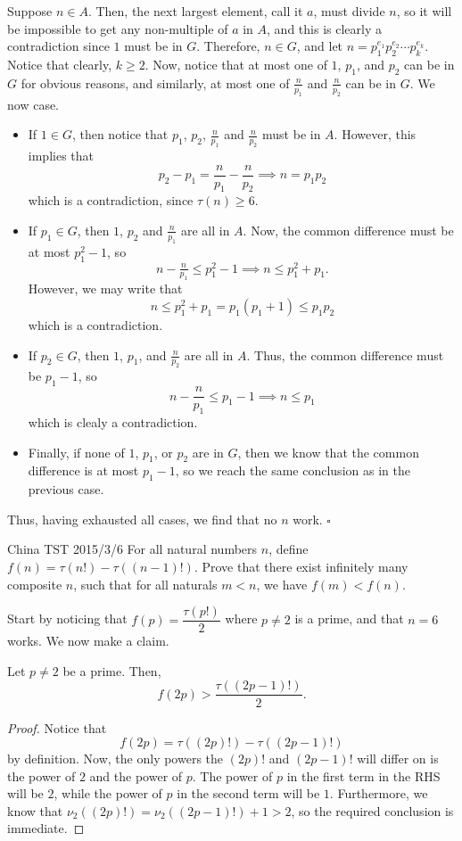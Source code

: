 \documentclass{article}
\begin{document}
Suppose $n \in A$. Then, the next largest element, call it $a$, must divide $n$, so it will be impossible to get any non-multiple of $a$ in $A$, and this is clearly a contradiction since $1$ must be in $G$. Therefore, $n \in G$, and let $n = p_1^{e_1}p_2^{e_2}\cdots p_k^{e_k}$. Notice that clearly, $k \ge 2$. Now, notice that at most one of $1$, $p_1$, and $p_2$ can be in $G$ for obvious reasons, and similarly, at most one of $\tfrac{n}{p_1}$ and $\tfrac{n}{p_2}$ can be in $G$. We now case.

\begin{itemize}
\item If $1 \in G$, then notice that $p_1$, $p_2$, $\tfrac{n}{p_1}$ and $\tfrac{n}{p_2}$ must be in $A$. However, this implies that \[p_2-p_1 = \dfrac{n}{p_1}-\dfrac{n}{p_2} \implies n = p_1p_2\] which is a contradiction, since $\tau(n) \ge 6$.
\item If $p_1 \in G$, then $1$, $p_2$ and $\tfrac{n}{p_1}$ are all in $A$. Now, the common difference must be at most $p_1^2-1$, so \[n-\tfrac{n}{p_1} \le p_1^2-1 \implies n \le p_1^2+p_1.\] However, we may write that \[n \le p_1^2+p_1 = p_1(p_1+1) \le p_1p_2\] which is a contradiction.
\item If $p_2 \in G$, then $1$, $p_1$, and $\tfrac{n}{p_2}$ are all in $A$. Thus, the common difference must be $p_1-1$, so \[n-\dfrac{n}{p_1} \le p_1-1 \implies n \le p_1\] which is clealy a contradiction.
\item Finally, if none of $1$, $p_1$, or $p_2$ are in $G$, then we know that the common difference is at most $p_1-1$, so we reach the same conclusion as in the previous case.
\end{itemize}

Thus, having exhausted all cases, we find that no $n$ work. $\square$

\begin{problem}[3.7.21]{China TST 2015/3/6}
For all natural numbers $n$, define $f(n) = \tau(n!) - \tau((n - 1)!)$. Prove that there exist infinitely many composite $n$, such that for all naturals $m < n$, we have $f(m) < f(n)$.
\end{problem}

Start by noticing that $f(p) = \dfrac{\tau(p!)}{2}$ where $p \neq 2$ is a prime, and that $n = 6$ works. We now make a claim.

\begin{claim*}
Let $p \neq 2$ be a prime. Then, \[f(2p) > \dfrac{\tau((2p-1)!)}{2}.\]
\end{claim*}
\begin{proof}
Notice that \[f(2p) = \tau((2p)!)-\tau((2p-1)!)\] by definition. Now, the only powers the $(2p)!$ and $(2p-1)!$ will differ on is the power of $2$ and the power of $p$. The power of $p$ in the first term in the RHS will be $2$, while the power of $p$ in the second term will be $1$. Furthermore, we know that $\nu_2((2p)!) = \nu_2((2p-1)!)+1 > 2$, so the required conclusion is immediate.
\end{proof}
\end{document}
